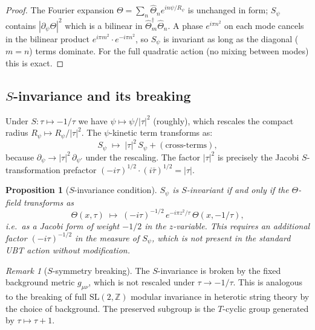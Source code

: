 \documentclass[12pt,a4paper]{article}
\newtheorem{proposition}[theorem]{Proposition}
\theoremstyle{remark}
\newtheorem{remark}[theorem]{Remark}
\newcommand{\Z}{\mathbb{Z}}
\newcommand{\SL}{\mathrm{SL}}
\begin{document}
\begin{proof}
The Fourier expansion $\Theta = \sum_n \hat\Theta_n e^{in\psi/R_\psi}$
is unchanged in form; $S_\psi$ contains $|\partial_\psi\Theta|^2$ which
is a bilinear in $\hat\Theta_m^\dagger\hat\Theta_n$.  A phase
$e^{i\pi n^2}$ on each mode cancels in the bilinear product
$e^{i\pi m^2}\cdot e^{-i\pi n^2}$, so $S_\psi$ is invariant as long
as the diagonal ($m=n$) terms dominate.  For the
full quadratic action (no mixing between modes) this is exact.
\end{proof}

\subsection{$S$-invariance and its breaking}

Under $S:\tau\mapsto-1/\tau$ we have $\psi\mapsto\psi/|\tau|^2$ (roughly),
which rescales the compact radius $R_\psi\mapsto R_\psi/|\tau|^2$.  The
$\psi$-kinetic term transforms as:
\begin{equation}
  \label{eq:S_rescale}
  S_\psi \;\mapsto\;
  |\tau|^2\,S_\psi + (\text{cross-terms}),
\end{equation}
because $\partial_\psi\to|\tau|^2\,\partial_{\psi'}$ under the rescaling.
The factor $|\tau|^2$ is precisely the Jacobi $S$-transformation prefactor
$(-i\tau)^{1/2}\cdot(i\bar\tau)^{1/2}=|\tau|$.

\begin{proposition}[$S$-invariance condition]
\label{prop:S_condition}
$S_\psi$ is $S$-invariant if and only if the $\Theta$-field transforms as
\begin{equation}
  \Theta(x,\tau) \;\mapsto\;
  (-i\tau)^{-1/2}\,e^{-i\pi z^2/\tau}\,\Theta(x,-1/\tau),
\end{equation}
i.e.\ as a Jacobi form of weight $-1/2$ in the $z$-variable.  This
requires an additional factor $(-i\tau)^{-1/2}$ in the measure of
$S_\psi$, which is not present in the standard UBT action without
modification.
\end{proposition}

\begin{remark}[$S$-symmetry breaking]
The $S$-invariance is broken by the fixed background metric $g_{\mu\nu}$,
which is not rescaled under $\tau\to-1/\tau$.  This is analogous to
the breaking of full $\SL(2,\Z)$ modular invariance in heterotic string
theory by the choice of background.  The preserved subgroup is the
$T$-cyclic group generated by $\tau\mapsto\tau+1$.
\end{remark}
\end{document}
